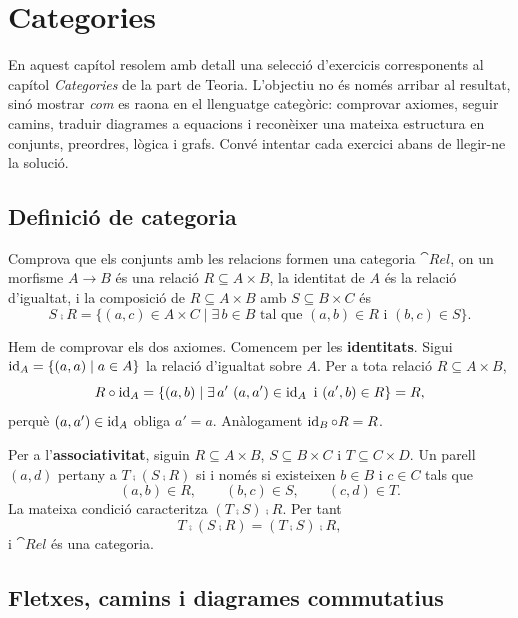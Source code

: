 \chapter{Categories}

En aquest capítol resolem amb detall una selecció d'exercicis corresponents al capítol \emph{Categories} de la part de Teoria. L'objectiu no és només arribar al resultat, sinó mostrar \emph{com} es raona en el llenguatge categòric: comprovar axiomes, seguir camins, traduir diagrames a equacions i reconèixer una mateixa estructura en conjunts, preordres, lògica i grafs. Convé intentar cada exercici abans de llegir-ne la solució.

\section{Definició de categoria}

\begin{exercici}\label{exr:pr-rel}
Comprova que els conjunts amb les relacions formen una categoria $\cat{Rel}$, on un morfisme $A\to B$ és una relació $R\subseteq A\times B$, la identitat de $A$ és la relació d'igualtat, i la composició de $R\subseteq A\times B$ amb $S\subseteq B\times C$ és
\[
S\comp R=\{(a,c)\in A\times C\mid \exists\,b\in B\text{ tal que }(a,b)\in R\text{ i }(b,c)\in S\}.
\]
\end{exercici}

\begin{solucio}
Hem de comprovar els dos axiomes. Comencem per les \textbf{identitats}. Sigui $\operatorname{id}_A=\{(a,a)\mid a\in A\}$ la relació d'igualtat sobre $A$. Per a tota relació $R\subseteq A\times B$,
\[
R\circ\operatorname{id}_A
=\{(a,b)\mid \exists\,a'\ (a,a')\in\operatorname{id}_A\text{ i }(a',b)\in R\}
=R,
\]
perquè $(a,a')\in\operatorname{id}_A$ obliga $a'=a$. Anàlogament $\operatorname{id}_B\circ R=R$.

Per a l'\textbf{associativitat}, siguin $R\subseteq A\times B$, $S\subseteq B\times C$ i $T\subseteq C\times D$. Un parell $(a,d)$ pertany a $T\comp(S\comp R)$ si i només si existeixen $b\in B$ i $c\in C$ tals que
\[
(a,b)\in R,
\qquad
(b,c)\in S,
\qquad
(c,d)\in T.
\]
La mateixa condició caracteritza $(T\comp S)\comp R$. Per tant
\[
T\comp(S\comp R)=(T\comp S)\comp R,
\]
i $\cat{Rel}$ és una categoria.
\end{solucio}

\section{Fletxes, camins i diagrames commutatius}

